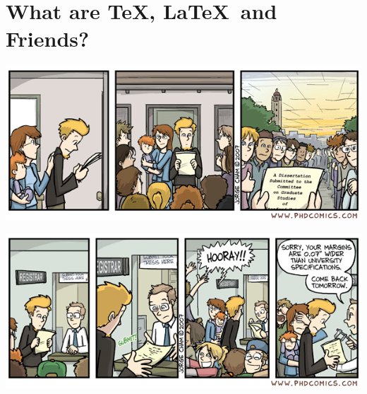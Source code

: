 \section[Introduction]{What are \TeX, \LaTeX\ and Friends?}

\begin{frame}

\includegraphics[width=.53\textwidth]{phdcomics-submission01}\par
{}
\hfill\includegraphics[width=.53\textwidth]{phdcomics-submission03}

\end{frame}


